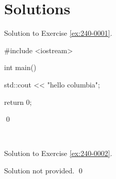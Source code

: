 

\newpage\section*{Solutions}
Solution to Exercise \ref{ex:240-0001}.

\begin{console}
#include <iostream>

int main()
{
    std::cout << "hello columbia\n";
    
    return 0;
}
\end{console}
\qed


\setlength{\oldparskip}{\parskip}
\setlength{\parskip}{1.0\oldparskip}

{\tiny{\,}}
        
\setlength{\parskip}{\oldparskip}
        



Solution to Exercise \ref{ex:240-0002}.


    Solution not provided.
    \qed


\setlength{\oldparskip}{\parskip}
\setlength{\parskip}{1.0\oldparskip}

{\tiny{\,}}
        
\setlength{\parskip}{\oldparskip}
        
